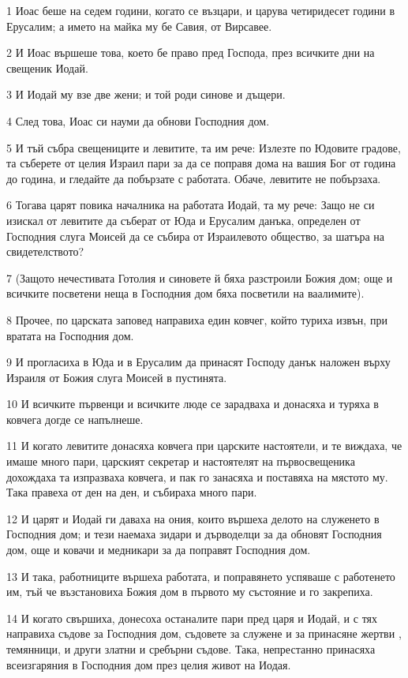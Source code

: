 \par 1 Иоас беше на седем години, когато се възцари, и царува четиридесет години в Ерусалим; а името на майка му бе Савия, от Вирсавее.
\par 2 И Иоас вършеше това, което бе право пред Господа, през всичките дни на свещеник Иодай.
\par 3 И Иодай му взе две жени; и той роди синове и дъщери.
\par 4 След това, Иоас си науми да обнови Господния дом.
\par 5 И тъй събра свещениците и левитите, та им рече: Излезте по Юдовите градове, та съберете от целия Израил пари за да се поправя дома на вашия Бог от година до година, и гледайте да побързате с работата. Обаче, левитите не побързаха.
\par 6 Тогава царят повика началника на работата Иодай, та му рече: Защо не си изискал от левитите да съберат от Юда и Ерусалим данъка, определен от Господния слуга Моисей да се събира от Израилевото общество, за шатъра на свидетелството?
\par 7 (Защото нечестивата Готолия и синовете й бяха разстроили Божия дом; още и всичките посветени неща в Господния дом бяха посветили на ваалимите).
\par 8 Прочее, по царската заповед направиха един ковчег, който туриха извън, при вратата на Господния дом.
\par 9 И прогласиха в Юда и в Ерусалим да принасят Господу данък наложен върху Израиля от Божия слуга Моисей в пустинята.
\par 10 И всичките първенци и всичките люде се зарадваха и донасяха и туряха в ковчега догде се напълнеше.
\par 11 И когато левитите донасяха ковчега при царските настоятели, и те виждаха, че имаше много пари, царският секретар и настоятелят на първосвещеника дохождаха та изпразваха ковчега, и пак го занасяха и поставяха на мястото му. Така правеха от ден на ден, и събираха много пари.
\par 12 И царят и Иодай ги даваха на ония, които вършеха делото на служенето в Господния дом; и тези наемаха зидари и дърводелци за да обновят Господния дом, още и ковачи и медникари за да поправят Господния дом.
\par 13 И така, работниците вършеха работата, и поправянето успяваше с работенето им, тъй че възстановиха Божия дом в първото му състояние и го закрепиха.
\par 14 И когато свършиха, донесоха останалите пари пред царя и Иодай, и с тях направиха съдове за Господния дом, съдовете за служене и за принасяне жертви , темянници, и други златни и сребърни съдове. Така, непрестанно принасяха всеизгаряния в Господния дом през целия живот на Иодая.
